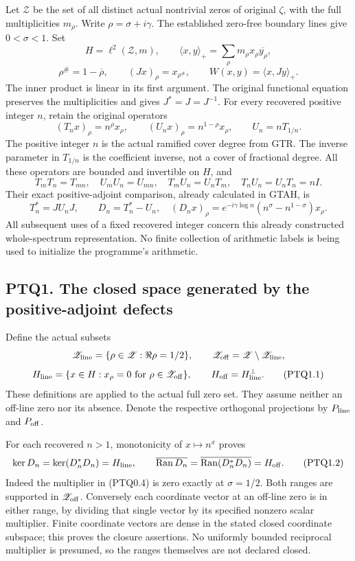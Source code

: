 Let \(\mathscr Z\) be the set of all distinct actual nontrivial zeros of
original \(\zeta\), with the full multiplicities \(m_\rho\). Write
\(\rho=\sigma+i\gamma\). The established zero-free boundary lines give
\(0<\sigma<1\). Set \[
H=\ell^2(\mathscr Z,m),\qquad
\langle x,y\rangle_+=\sum_\rho m_\rho x_\rho\overline{y_\rho},
\] \[
\rho^\#=1-\overline\rho,\qquad
(Jx)_\rho=x_{\rho^\#},\qquad
W(x,y)=\langle x,Jy\rangle_+.
\tag{PTQ0.1}
\] The inner product is linear in its first argument. The original
functional equation preserves the multiplicities and gives
\(J^*=J=J^{-1}\). For every recovered positive integer \(n\), retain the
original operators \[
(T_nx)_\rho=n^\rho x_\rho,
\qquad(U_nx)_\rho=n^{1-\rho}x_\rho,
\qquad U_n=nT_{1/n}.
\tag{PTQ0.2}
\] The positive integer \(n\) is the actual ramified cover degree from
GTR. The inverse parameter in \(T_{1/n}\) is the coefficient inverse,
not a cover of fractional degree. All these operators are bounded and
invertible on \(H\), and \[
T_mT_n=T_{mn},\quad U_mU_n=U_{mn},\quad
T_mU_n=U_nT_m,\quad T_nU_n=U_nT_n=nI.
\tag{PTQ0.3}
\] Their exact positive-adjoint comparison, already calculated in GTAH,
is \[
T_n^*=JU_nJ,\qquad
D_n=T_n^*-U_n,
\quad(D_nx)_\rho=e^{-i\gamma\log n}
(n^\sigma-n^{1-\sigma})x_\rho.
\tag{PTQ0.4}
\] All subsequent uses of a fixed recovered integer concern this already
constructed whole-spectrum representation. No finite collection of
arithmetic labels is being used to initialize the programme's
arithmetic.

\subsection{PTQ1. The closed space generated by the positive-adjoint
defects}\label{ptq1.-the-closed-space-generated-by-the-positive-adjoint-defects}

Define the actual subsets \[
\mathscr Z_{\rm line}=\{\rho\in\mathscr Z:\Re\rho=1/2\},
\qquad\mathscr Z_{\rm off}=\mathscr Z\setminus\mathscr Z_{\rm line},
\] \[
H_{\rm line}=\{x\in H:x_\rho=0\text{ for }\rho\in\mathscr Z_{\rm off}\},
\qquad H_{\rm off}=H_{\rm line}^{\perp}.
\tag{PTQ1.1}
\] These definitions are applied to the actual full zero set. They
assume neither an off-line zero nor its absence. Denote the respective
orthogonal projections by \(P_{\rm line}\) and \(P_{\rm off}\).

For each recovered \(n>1\), monotonicity of \(x\mapsto n^x\) proves \[
\ker D_n=\ker(D_n^*D_n)=H_{\rm line},
\qquad
\overline{\operatorname{Ran}D_n}
=\overline{\operatorname{Ran}(D_n^*D_n)}=H_{\rm off}.
\tag{PTQ1.2}
\] Indeed the multiplier in (PTQ0.4) is zero exactly at \(\sigma=1/2\).
Both ranges are supported in \(\mathscr Z_{\rm off}\). Conversely each
coordinate vector at an off-line zero is in either range, by dividing
that single vector by its specified nonzero scalar multiplier. Finite
coordinate vectors are dense in the stated closed coordinate subspace;
this proves the closure assertions. No uniformly bounded reciprocal
multiplier is presumed, so the ranges themselves are not declared
closed.

